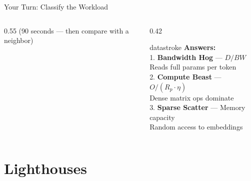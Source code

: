 \documentclass[aspectratio=169, 12pt]{beamer}
\begin{document}
\begin{frame}{Your Turn: Classify the Workload}
\begin{columns}[T]
\begin{column}{0.55\textwidth}
    \vspace{0.1cm}
    {\footnotesize\textcolor{midgray}{(90 seconds --- then compare with a neighbor)}}
  \end{column}
  \begin{column}{0.42\textwidth}
    \pause
    \begin{mlsyscard}{datastroke}
    \textbf{Answers:}\\[0.1cm]
    {\footnotesize
    1. \textcolor{datastroke}{\textbf{Bandwidth Hog}} --- $D/BW$\\
    Reads full params per token\\[0.1cm]
    2. \textcolor{computestroke}{\textbf{Compute Beast}} --- $O/(R_p \cdot \eta)$\\
    Dense matrix ops dominate\\[0.1cm]
    3. \textcolor{routingstroke}{\textbf{Sparse Scatter}} --- Memory capacity\\
    Random access to embeddings
    }
    \end{mlsyscard}
  \end{column}
\end{columns}

\end{frame}

\section{Lighthouses}
\end{document}
